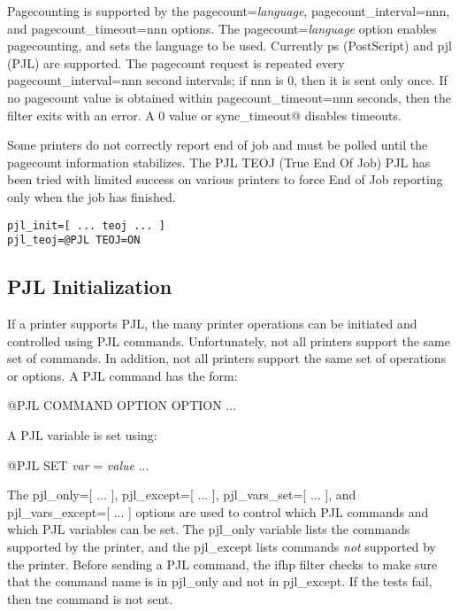 \documentclass[a4paper]{article}
\begin{document}
Pagecounting is supported by the
{\ttfamily pagecount=}{\itshape language\/},
{\ttfamily pagecount\_interval=nnn},
and
{\ttfamily pagecount\_timeout=nnn}
options.
The
{\ttfamily pagecount=}{\itshape language\/}
option enables pagecounting, and sets the language to be used.
Currently
{\ttfamily ps} (PostScript)
and
{\ttfamily pjl} (PJL)
are supported.
The pagecount request is repeated every
{\ttfamily pagecount\_interval=nnn}
second intervals; if nnn is 0, then it is sent only once.
If no pagecount value is obtained within
{\ttfamily pagecount\_timeout=nnn}
seconds, then the filter exits with an error.
A 0 value or
{\ttfamily sync\_timeout@}
disables timeouts.

Some printers do not correctly report end of job and must be polled
until the pagecount information stabilizes.
The PJL TEOJ (True End Of Job) PJL has been tried with limited success
on various printers to force End of Job reporting only when the
job has finished.
\begin{tscreen}
\begin{verbatim}
pjl_init=[ ... teoj ... ]
pjl_teoj=@PJL TEOJ=ON
\end{verbatim}
\end{tscreen}



\subsection{PJL Initialization
\label{pjlinit}
\label{endpage}
\label{startpage}
\label{pjl_only}
\label{pjl_except}
\label{pjl_vars_set}
\label{pjl_vars_except}
\label{pjl_user_opts}
\label{pjl_init}}

If a printer supports PJL,
the many printer operations can be initiated and controlled using
PJL commands.
Unfortunately,
not all printers support the same set of commands.
In addition,
not all printers support the same set of operations or options.
A PJL command has the form:
\begin{tscreen}
@PJL COMMAND OPTION OPTION ...
\end{tscreen}

A PJL variable is set using:
\begin{tscreen}
@PJL SET {\itshape var\/} = {\itshape value\/} ...
\end{tscreen}

The
{\ttfamily pjl\_only=[ ... ]},
{\ttfamily pjl\_except=[ ... ]},
{\ttfamily pjl\_vars\_set=[ ... ]},
and
{\ttfamily pjl\_vars\_except=[ ... ]}
options are used to control which PJL commands and which PJL variables
can be set.
The 
{\ttfamily pjl\_only}
variable lists the commands supported by the printer,
and the
{\ttfamily pjl\_except}
lists commands {\itshape not\/}
supported by the printer.
Before sending a PJL command,
the
{\ttfamily ifhp}
filter checks to make sure that the command name is in
{\ttfamily pjl\_only}
and not in
{\ttfamily pjl\_except}.
If the tests fail, then tne command is not sent.
\end{document}
